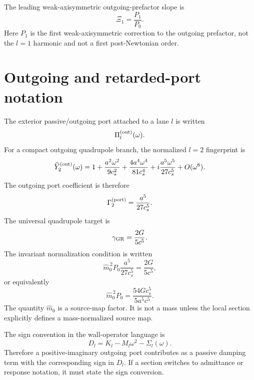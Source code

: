 The leading weak-axisymmetric outgoing-prefactor slope is
\begin{equation}
  \Xi_1=\frac{P_1}{P_0}.
\end{equation}
Here \(P_1\) is the first weak-axisymmetric correction to the outgoing prefactor, not the \(l=1\) harmonic and not a first post-Newtonian order.

\section{Outgoing and retarded-port notation}
\label{sec:outgoing-notation}

The exterior passive/outgoing port attached to a lane \(l\) is written
\begin{equation}
  \Pi_l^{\rm(out)}(\omega).
\end{equation}
For a compact outgoing quadrupole branch, the normalized \(l=2\) fingerprint is
\begin{equation}
  \widehat Y_2^{\rm(out)}(\omega)
  =
  1+\frac{a^2\omega^2}{9c_s^2}
  +\frac{4a^4\omega^4}{81c_s^4}
  +i\frac{a^5\omega^5}{27c_s^5}
  +O(\omega^6).
\end{equation}
The outgoing port coefficient is therefore
\begin{equation}
  \Gamma_2^{\rm(port)}=\frac{a^5}{27c_s^5}.
\end{equation}
The universal quadrupole target is
\begin{equation}
  \gamma_{\rm GR}=\frac{2G}{5c^5}.
\end{equation}
The invariant normalization condition is written
\begin{equation}
  \hat m_0^{\,2}P_0\frac{a^5}{27c_s^5}=\frac{2G}{5c^5},
\end{equation}
or equivalently
\begin{equation}
  \hat m_0^{\,2}P_0=\frac{54Gc_s^5}{5a^5c^5}.
\end{equation}
The quantity \(\hat m_0\) is a source-map factor.  It is not a mass unless the local section explicitly defines a mass-normalized source map.

The sign convention in the wall-operator language is
\begin{equation}
  D_l=K_l-M_l\omega^2-\Sigma_l(\omega).
\end{equation}
Therefore a positive-imaginary outgoing port contributes as a passive damping term with the corresponding sign in \(D_l\).  If a section switches to admittance or response notation, it must state the sign conversion.

